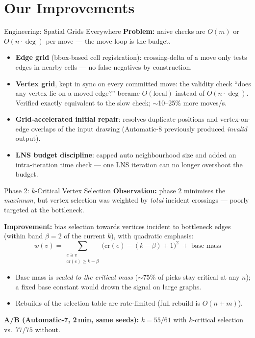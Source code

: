 \section{Our Improvements}

\begin{frame}{Engineering: Spatial Grids Everywhere}
  \textbf{Problem:} naive checks are $O(m)$ or $O(n\cdot \deg)$ per move --- the move loop is the budget.
  \medskip
  \begin{itemize}
    \item \textbf{Edge grid} (bbox-based cell registration): crossing-delta of a move only tests
          edges in nearby cells --- no false negatives by construction.
    \item \textbf{Vertex grid}, kept in sync on every committed move: the validity check
          ``does any vertex lie on a moved edge?'' became $O(\text{local})$ instead of $O(n\cdot\deg)$.
          Verified exactly equivalent to the slow check; $\sim$10--25\% more moves/s.
    \item \textbf{Grid-accelerated initial repair}: resolves duplicate positions and
          vertex-on-edge overlaps of the input drawing (Automatic-8 previously produced
          \emph{invalid} output).
    \item \textbf{LNS budget discipline}: capped auto neighbourhood size and added an
          intra-iteration time check --- one LNS iteration can no longer overshoot the budget.
  \end{itemize}
\end{frame}

\begin{frame}{Phase 2: $k$-Critical Vertex Selection}
  \textbf{Observation:} phase 2 minimises the \emph{maximum}, but vertex selection was weighted by
  \emph{total} incident crossings --- poorly targeted at the bottleneck.
  \medskip

  \textbf{Improvement:} bias selection towards vertices incident to bottleneck edges
  (within band $\beta=2$ of the current $k$), with quadratic emphasis:
  \[
    w(v) = \sum_{\substack{e \ni v \\ \mathrm{cr}(e) \ge k-\beta}} \bigl(\mathrm{cr}(e)-(k-\beta)+1\bigr)^2
    \;+\; \text{base mass}
  \]
  \begin{itemize}
    \item Base mass is \emph{scaled to the critical mass} ($\sim$75\% of picks stay critical at any $n$);
          a fixed base constant would drown the signal on large graphs.
    \item Rebuilds of the selection table are rate-limited (full rebuild is $O(n+m)$).
  \end{itemize}
  \medskip
  \textbf{A/B (Automatic-7, 2\,min, same seeds):} $k = 55/61$ with $k$-critical selection
  vs.\ $77/75$ without.
\end{frame}


